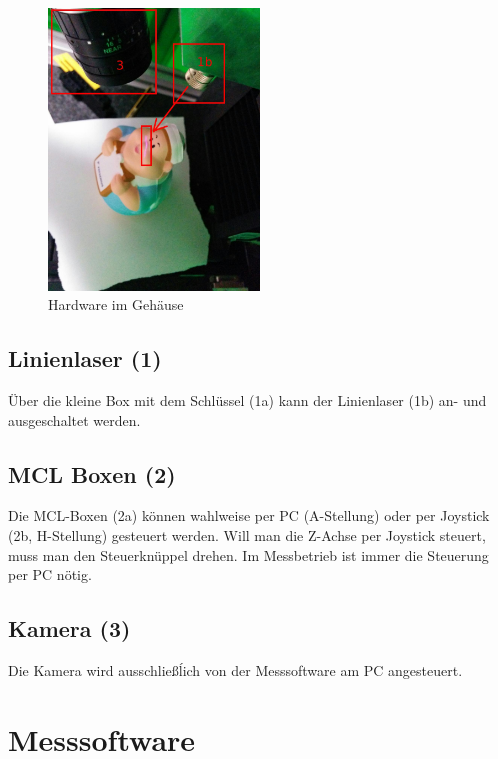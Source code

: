 \documentclass[a4paper,10pt]{scrartcl}
\begin{document}
\begin{figure}[h]
  \centering
  \includegraphics[width=0.5\textwidth]{include/IMG_20160412_135830.jpg}
  \caption{Hardware im Gehäuse}
  \label{fig:overview}
\end{figure}

\subsection{Linienlaser (1)}

Über die kleine Box mit dem Schlüssel (1a) kann der Linienlaser (1b) an- und ausgeschaltet werden.

\subsection{MCL Boxen (2)}

Die MCL-Boxen (2a) können wahlweise per PC (A-Stellung) oder per Joystick (2b, H-Stellung) gesteuert
werden. Will man die Z-Achse per Joystick steuert, muss man den Steuerknüppel drehen. Im Messbetrieb
ist immer die Steuerung per PC nötig.

\subsection{Kamera (3)}

Die Kamera wird ausschließĺich von der Messsoftware am PC angesteuert.

\newpage

\section{Messsoftware}
\end{document}

